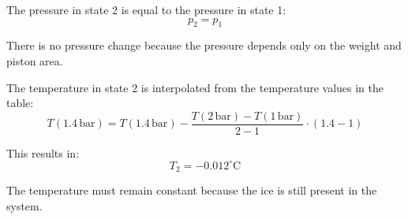 The pressure in state 2 is equal to the pressure in state 1:  
\[
p_2 = p_1
\]  

There is no pressure change because the pressure depends only on the weight and piston area.  

The temperature in state 2 is interpolated from the temperature values in the table:  
\[
T(1.4 \, \text{bar}) = T(1.4 \, \text{bar}) - \frac{T(2 \, \text{bar}) - T(1 \, \text{bar})}{2 - 1} \cdot (1.4 - 1)
\]  

This results in:  
\[
T_2 = -0.012^\circ \text{C}
\]  

The temperature must remain constant because the ice is still present in the system.